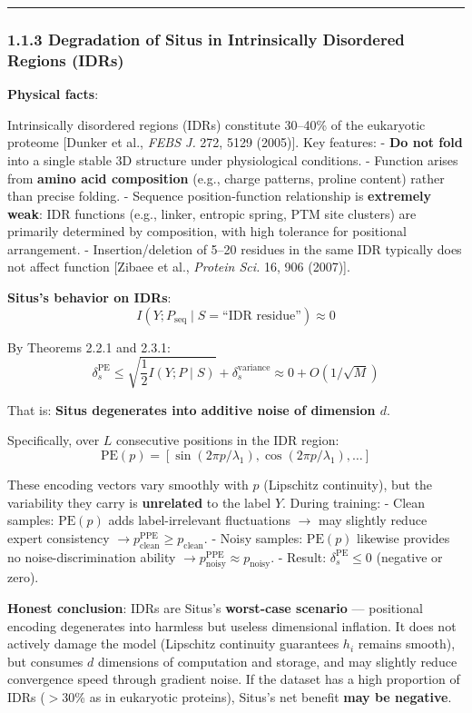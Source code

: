 \documentclass[
  12pt,
]{article}
\begin{document}
\begin{center}\rule{0.5\linewidth}{0.5pt}\end{center}

\subsubsection{1.1.3 Degradation of Situs in Intrinsically Disordered Regions (IDRs)}\label{idr-degradation}

\textbf{Physical facts}:

Intrinsically disordered regions (IDRs) constitute 30--40\% of the eukaryotic proteome [Dunker et al., \emph{FEBS J.} 272, 5129 (2005)]. Key features:
- \textbf{Do not fold} into a single stable 3D structure under physiological conditions.
- Function arises from \textbf{amino acid composition} (e.g., charge patterns, proline content) rather than precise folding.
- Sequence position-function relationship is \textbf{extremely weak}: IDR functions (e.g., linker, entropic spring, PTM site clusters) are primarily determined by composition, with high tolerance for positional arrangement.
- Insertion/deletion of 5--20 residues in the same IDR typically does not affect function [Zibaee et al., \emph{Protein Sci.} 16, 906 (2007)].

\textbf{Situs's behavior on IDRs}:
\[I(Y; P_{\text{seq}} \mid S = \text{``IDR residue''}) \approx 0\]

By Theorems 2.2.1 and 2.3.1:
\[\delta_s^{\text{PE}} \leq \sqrt{\frac{1}{2} I(Y; P \mid S)} + \delta_s^{\text{variance}} \approx 0 + O(1/\sqrt{M})\]

That is: \textbf{Situs degenerates into additive noise of dimension $d$}.

Specifically, over $L$ consecutive positions in the IDR region:
\[\text{PE}(p) = [\sin(2\pi p/\lambda_1), \cos(2\pi p/\lambda_1), \ldots]\]

These encoding vectors vary smoothly with $p$ (Lipschitz continuity), but the variability they carry is \textbf{unrelated} to the label $Y$. During training:
- Clean samples: $\text{PE}(p)$ adds label-irrelevant fluctuations $\to$ may slightly reduce expert consistency $\to p_{\text{clean}}^{\text{PPE}} \geq p_{\text{clean}}$.
- Noisy samples: $\text{PE}(p)$ likewise provides no noise-discrimination ability $\to p_{\text{noisy}}^{\text{PPE}} \approx p_{\text{noisy}}$.
- Result: $\delta_s^{\text{PE}} \leq 0$ (negative or zero).

\textbf{Honest conclusion}: IDRs are Situs's \textbf{worst-case scenario} --- positional encoding degenerates into harmless but useless dimensional inflation. It does not actively damage the model (Lipschitz continuity guarantees $h_i$ remains smooth), but consumes $d$ dimensions of computation and storage, and may slightly reduce convergence speed through gradient noise. If the dataset has a high proportion of IDRs ($>$30\% as in eukaryotic proteins), Situs's net benefit \textbf{may be negative}.
\end{document}
